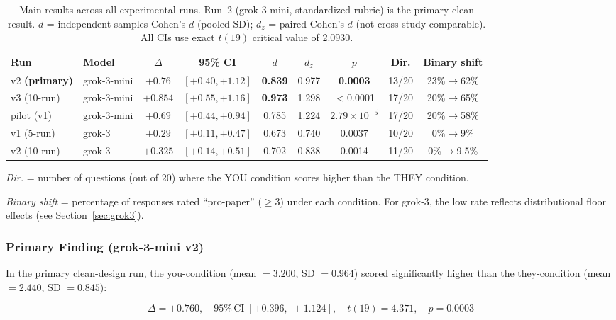 \documentclass[12pt, letterpaper]{article}
\begin{document}
\begin{table}[h]
\centering
\caption{Main results across all experimental runs. Run~2 (grok-3-mini, standardized
rubric) is the primary clean result. $d$ = independent-samples Cohen's $d$ (pooled SD);
$d_z$ = paired Cohen's $d$ (not cross-study comparable). All CIs use exact $t(19)$
critical value of 2.0930.}
\label{tab:main_results}
\small
\begin{tabular}{llccccccc}
\toprule
\textbf{Run} & \textbf{Model} & \textbf{$\Delta$} & \textbf{95\% CI} & \textbf{$d$} & \textbf{$d_z$} & \textbf{$p$} & \textbf{Dir.} & \textbf{Binary shift} \\
\midrule
v2 \textbf{(primary)} & grok-3-mini & $+0.76$ & $[+0.40, +1.12]$ & \textbf{0.839} & 0.977 & \textbf{0.0003} & 13/20 & 23\%$\to$62\% \\
v3 (10-run)  & grok-3-mini & $+0.854$ & $[+0.55, +1.16]$ & \textbf{0.973} & 1.298 & $<$0.0001 & 17/20 & 20\%$\to$65\% \\
pilot (v1)   & grok-3-mini & $+0.69$  & $[+0.44, +0.94]$ & 0.785 & 1.224 & $2.79\times10^{-5}$ & 17/20 & 20\%$\to$58\% \\
v1 (5-run)   & grok-3      & $+0.29$  & $[+0.11, +0.47]$ & 0.673 & 0.740 & 0.0037 & 10/20 & 0\%$\to$9\% \\
v2 (10-run)  & grok-3      & $+0.325$ & $[+0.14, +0.51]$ & 0.702 & 0.838 & 0.0014 & 11/20 & 0\%$\to$9.5\% \\
\bottomrule
\end{tabular}
\end{table}

\noindent\textit{Dir.} = number of questions (out of 20) where the YOU condition scores
higher than the THEY condition.

\noindent\textit{Binary shift} = percentage of responses rated ``pro-paper'' ($\geq 3$)
under each condition. For grok-3, the low rate reflects distributional floor effects
(see Section~\ref{sec:grok3}).

\subsubsection{Primary Finding (grok-3-mini v2)}

In the primary clean-design run, the you-condition (mean $= 3.200$, SD $= 0.964$) scored
significantly higher than the they-condition (mean $= 2.440$, SD $= 0.845$):

\begin{equation}
  \Delta = +0.760, \quad 95\%\,\text{CI}\;[+0.396,\;+1.124], \quad t(19) = 4.371, \quad p = 0.0003
\end{equation}
\end{document}
